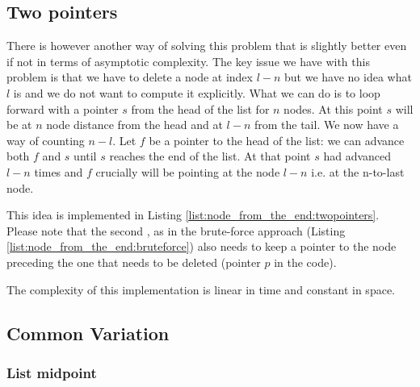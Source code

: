 

\subsection{Two pointers}
\label{node_from_the_end:sec:twopointers}
There is however another way of solving this problem that is slightly better even if not in terms of asymptotic complexity. 
The key issue we have with this problem is that we have to delete a node at index $l-n$ but we have no idea what $l$ is and we do not want to compute it explicitly. 
What we can do is to loop forward with a pointer $s$ from the head of the list for $n$ nodes. At this point $s$ will be at $n$ node distance from the head and at $l-n$ from the tail. We now have a way of counting $n-l$. Let $f$ be a pointer to the head of the list: we can advance both $f$ and $s$ until $s$ reaches the end of the list. At that point $s$ had advanced $l-n$ times and $f$ crucially will be pointing at the node $l-n$ i.e. at the n-to-last node.

This idea is implemented in Listing \ref{list:node_from_the_end:twopointers}. Please note that the second , as in the brute-force approach (Listing \ref{list:node_from_the_end:bruteforce}) also needs to keep a pointer to the node preceding the one that needs to be deleted (pointer $p$ in the code).

The complexity of this implementation is linear in time and constant in space.




\subsection{Common Variation}
\subsubsection{List midpoint}
\label{node_from_the_end:sec:list_midpoint}

